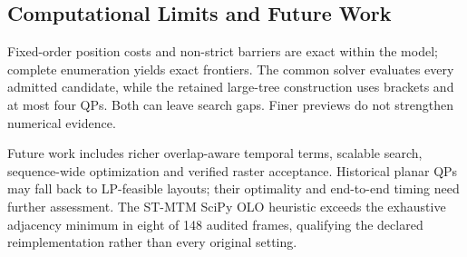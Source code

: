 \subsection{Computational Limits and Future Work}
Fixed-order position costs and non-strict barriers are exact within the model; complete enumeration yields exact frontiers. The common solver evaluates every admitted candidate, while the retained large-tree construction uses brackets and at most four QPs. Both can leave search gaps. Finer previews do not strengthen numerical evidence.

Future work includes richer overlap-aware temporal terms, scalable search, sequence-wide optimization and verified raster acceptance. Historical planar QPs may fall back to LP-feasible layouts; their optimality and end-to-end timing need further assessment. The ST-MTM SciPy OLO heuristic exceeds the exhaustive adjacency minimum in eight of 148 audited frames, qualifying the declared reimplementation rather than every original setting.
